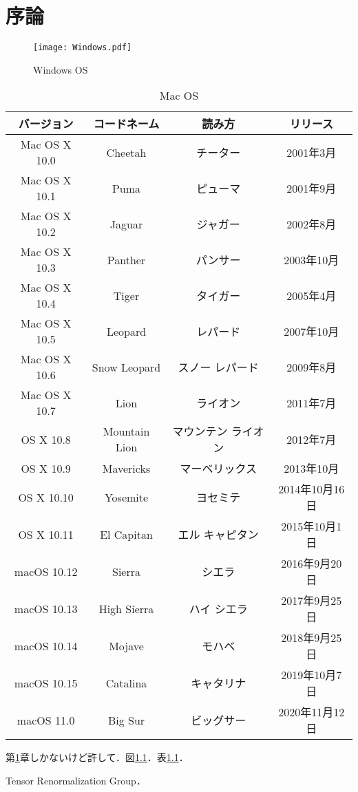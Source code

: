 \chapter{序論} \label{chap:introduction}

\begin{figure}[htbp]
  \begin{center}
    \texttt{[image: Windows.pdf]}
  \end{center}
  \caption{Windows OS}
  \label{fig:Windows}
\end{figure}

\begin{table}[htbp]
  \begin{center}
    \begin{tabular}{cccc}\toprule
      バージョン & コードネーム & 読み方 & リリース\\ \midrule
      Mac OS X 10.0 & Cheetah & チーター & 2001年3月\\
      Mac OS X 10.1 & Puma & ピューマ & 2001年9月\\
      Mac OS X 10.2 & Jaguar & ジャガー & 2002年8月\\
      Mac OS X 10.3 & Panther & パンサー & 2003年10月\\
      Mac OS X 10.4 & Tiger & タイガー & 2005年4月\\
      Mac OS X 10.5 & Leopard & レパード & 2007年10月\\
      Mac OS X 10.6 & Snow Leopard & スノー レパード & 2009年8月\\
      Mac OS X 10.7 & Lion & ライオン & 2011年7月\\
      OS X 10.8 & Mountain Lion & マウンテン ライオン & 2012年7月\\
      OS X 10.9 & Mavericks & マーベリックス & 2013年10月\\
      OS X 10.10 & Yosemite & ヨセミテ & 2014年10月16日\\
      OS X 10.11 & El Capitan & エル キャピタン & 2015年10月1日\\
      macOS 10.12 & Sierra & シエラ & 2016年9月20日\\
      macOS 10.13 & High Sierra & ハイ シエラ & 2017年9月25日\\
      macOS 10.14 & Mojave & モハベ & 2018年9月25日\\
      macOS 10.15 & Catalina & キャタリナ & 2019年10月7日\\
      macOS 11.0 & Big Sur & ビッグサー & 2020年11月12日\\ \bottomrule
    \end{tabular}
  \end{center}
  \caption{Mac OS}
  \label{tb:Mac}
\end{table}

第\ref{chap:introduction}章しかないけど許して．図\ref{fig:Windows}．表\ref{tb:Mac}．\par
Tensor Renormalization Group\cite{PhysRevLett.99.120601}．